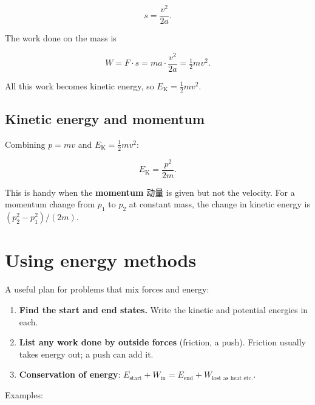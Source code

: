 \documentclass[11pt]{article}
\begin{document}
\[
s = \frac{v^{2}}{2a}.
\]

The work done on the mass is

\[
W = F \cdot s = m a \cdot \frac{v^{2}}{2a} = \tfrac{1}{2} m v^{2}.
\]

All this work becomes kinetic energy, so $E_{\text{K}} = \tfrac{1}{2} m v^{2}$.

\subsection*{Kinetic energy and momentum}

Combining $p = mv$ and $E_{\text{K}} = \tfrac{1}{2} m v^{2}$:

\[
E_{\text{K}} = \frac{p^{2}}{2m}.
\]

This is handy when the \textbf{momentum} 动量 is given but not the velocity. For a momentum change from $p_{1}$ to $p_{2}$ at constant mass, the change in kinetic energy is $(p_{2}^{2} - p_{1}^{2}) / (2m)$.

\section*{Using energy methods}

A useful plan for problems that mix forces and energy:

\begin{enumerate}
\item \textbf{Find the start and end states.} Write the kinetic and potential energies in each.

\item \textbf{List any work done by outside forces} (friction, a push). Friction usually takes energy out; a push can add it.

\item \textbf{Conservation of energy}: $E_{\text{start}} + W_{\text{in}} = E_{\text{end}} + W_{\text{lost as heat etc.}}$.

\end{enumerate}

Examples:
\end{document}
